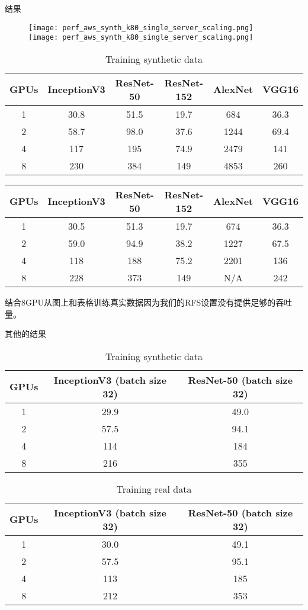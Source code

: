  结果
 \begin{figure}[H]
	 \centering
	 \texttt{[image: perf\_aws\_synth\_k80\_single\_server\_scaling.png]}
	 \texttt{[image: perf\_aws\_synth\_k80\_single\_server\_scaling.png]}
 \end{figure}
 \begin{table}[H]
	\centering
	\begin{tabular}{|c|c|c|c|c|c|}
		\hline
		GPUs	&InceptionV3	&ResNet-50	&ResNet-152	&AlexNet	&VGG16\\
		\hline
		1	&30.8	&51.5	&19.7	&684	&36.3\\
		\hline
		2	&58.7	&98.0	&37.6	&1244	&69.4\\
		\hline
		4	&117	&195	&74.9	&2479	&141\\
		\hline
		8	&230	&384	&149	&4853	&260\\
		\hline
	\end{tabular}
	 \caption{Training synthetic data}
\end{table}
 \begin{table}[H]
	 \centering
	 \begin{tabular}{|c|c|c|c|c|c|}
		\hline
		 GPUs	&InceptionV3	&ResNet-50	&ResNet-152	&AlexNet	&VGG16\\
		\hline
		 1	&30.5	&51.3	&19.7	&674	&36.3\\
		\hline
		 2	&59.0	&94.9	&38.2	&1227	&67.5\\
		\hline
		 4	&118	&188	&75.2	&2201	&136\\
		\hline
		 8	&228	&373	&149	&N/A	&242\\
		\hline
	 \end{tabular}
 \end{table}
 结合8GPU从图上和表格训练真实数据因为我们的RFS设置没有提供足够的吞吐量。
 
 其他的结果
 \begin{table}[H]
	\centering
	\begin{tabular}{|c|c|c|}
		\hline
		GPUs	&InceptionV3 (batch size 32)	&ResNet-50 (batch size 32)\\
		\hline
		1	&29.9	&49.0\\
		\hline
		2	&57.5	&94.1\\
		\hline
		4	&114	&184\\
		\hline
		8	&216	&355\\
		\hline
	\end{tabular}
	 \caption{Training synthetic data}
\end{table}
 \begin{table}[H]
	\centering
	\begin{tabular}{|c|c|c|}
		\hline
		GPUs	&InceptionV3 (batch size 32)	&ResNet-50 (batch size 32)\\
		\hline
		1	&30.0	&49.1\\
		\hline
		2	&57.5	&95.1\\
		\hline
		4	&113	&185\\
		\hline
		8	&212	&353\\
		\hline
	\end{tabular}
	 \caption{Training real data}
\end{table}
